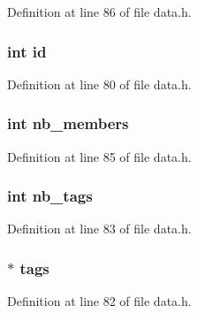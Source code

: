 Definition at line 86 of file data.\+h.

\subsubsection[{\texorpdfstring{id}{id}}]{\setlength{\rightskip}{0pt plus 5cm}int id}\hypertarget{struct_relation_a7441ef0865bcb3db9b8064dd7375c1ea}{}\label{struct_relation_a7441ef0865bcb3db9b8064dd7375c1ea}


Definition at line 80 of file data.\+h.

\subsubsection[{\texorpdfstring{nb\+\_\+members}{nb_members}}]{\setlength{\rightskip}{0pt plus 5cm}int nb\+\_\+members}\hypertarget{struct_relation_abe6a73091b8a8c9432bf4b149925229d}{}\label{struct_relation_abe6a73091b8a8c9432bf4b149925229d}


Definition at line 85 of file data.\+h.

\subsubsection[{\texorpdfstring{nb\+\_\+tags}{nb_tags}}]{\setlength{\rightskip}{0pt plus 5cm}int nb\+\_\+tags}\hypertarget{struct_relation_a5090182abe45c6d1577adb6c195378f3}{}\label{struct_relation_a5090182abe45c6d1577adb6c195378f3}


Definition at line 83 of file data.\+h.

\subsubsection[{\texorpdfstring{tags}{tags}}]{$\ast$ tags}\hypertarget{struct_relation_a5b3cb60eeefcbc271683754bf243aebb}{}\label{struct_relation_a5b3cb60eeefcbc271683754bf243aebb}


Definition at line 82 of file data.\+h.


